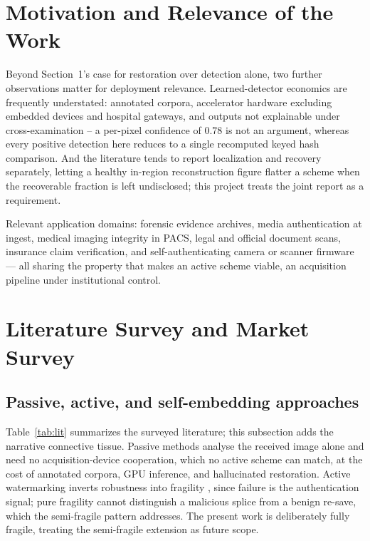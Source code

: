 \documentclass[12pt,a4paper]{article}
\begin{document}
\section{Motivation and Relevance of the Work}

Beyond Section~1's case for restoration over detection alone, two further
observations matter for deployment relevance. Learned-detector economics are
frequently understated: annotated corpora, accelerator hardware excluding
embedded devices and hospital gateways, and outputs not explainable under
cross-examination -- a per-pixel confidence of $0.78$ is not an argument,
whereas every positive detection here reduces to a single recomputed keyed
hash comparison. And the literature tends to report localization and recovery
separately, letting a healthy in-region reconstruction figure flatter a
scheme when the recoverable fraction is left undisclosed; this project treats
the joint report as a requirement.

Relevant application domains: forensic evidence archives, media
authentication at ingest, medical imaging integrity in PACS, legal and
official document scans, insurance claim verification, and
self-authenticating camera or scanner firmware --- all sharing the property
that makes an active scheme viable, an acquisition pipeline under
institutional control.

\section{Literature Survey and Market Survey}

\subsection{Passive, active, and self-embedding approaches}

Table~\ref{tab:lit} summarizes the surveyed literature; this subsection adds
the narrative connective tissue. Passive methods
\cite{zhou2018learning,wu2019mantranet} analyse the received image alone and
need no acquisition-device cooperation, which no active scheme can match, at
the cost of annotated corpora, GPU inference, and hallucinated restoration.
Active watermarking inverts robustness \cite{cox1997secure} into fragility
\cite{wong2001secret}, since failure is the authentication signal; pure
fragility cannot distinguish a malicious splice from a benign re-save, which
the semi-fragile pattern \cite{linchang2000} addresses. The present work is
deliberately fully fragile, treating the semi-fragile extension as future
scope.
\end{document}
